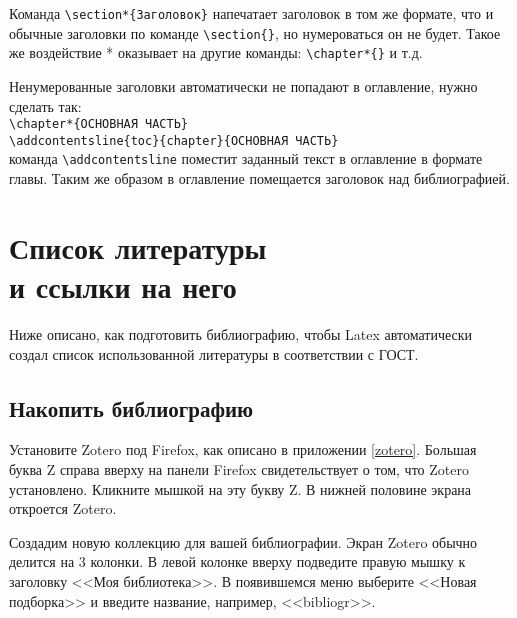 Команда \verb|\section*{Заголовок}| напечатает заголовок в том же формате, что и обычные заголовки по команде \verb|\section{}|, но нумероваться он не будет. Такое же воздействие * оказывает на другие команды: \verb|\chapter*{}| и т.д. 

Ненумерованные заголовки автоматически не попадают в оглавление, нужно сделать так:\\
\verb|\chapter*{ОСНОВНАЯ ЧАСТЬ}|\\
\verb|\addcontentsline{toc}{chapter}{ОСНОВНАЯ ЧАСТЬ}|\\
команда \verb|\addcontentsline| поместит заданный текст в оглавление в формате главы.
Таким же образом в оглавление помещается заголовок над библиографией.

\chapter[Список литературы и ссылки на него]{Список литературы\\ и ссылки на него}

Ниже описано, как подготовить библиографию, чтобы Latex автоматически создал список использованной литературы в соответствии с ГОСТ.
\section{Накопить библиографию}
Установите Zotero под Firefox, как описано в приложении \ref{zotero}.
Большая буква Z справа вверху на панели Firefox свидетельствует о том, что Zotero установлено. Кликните мышкой на эту букву Z. В нижней половине экрана откроется Zotero.

Создадим новую коллекцию для вашей библиографии. Экран Zotero обычно делится на 3 колонки. В левой колонке вверху подведите правую мышку к заголовку <<Моя библиотека>>. В появившемся меню выберите <<Новая подборка>> и введите название, например, <<bibliogr>>. 


